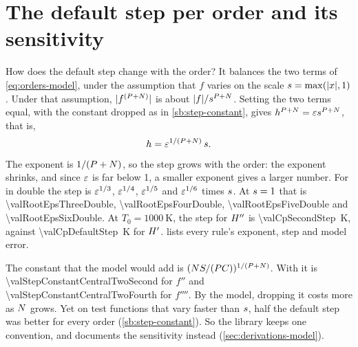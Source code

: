 \begin{figure}
\centering

\end{figure}

\section{The default step per order and its sensitivity}\label{sec:orders-step}

How does the default step change with the order? It balances the two terms of \cref{eq:orders-model}, under the
assumption that $f$ varies on the scale $s = \max(\lvert x \rvert, 1)$. Under that assumption,
$\lvert f^{(P + N)} \rvert$ is about $\lvert f \rvert / s^{P + N}$. Setting the two terms equal, with the
constant dropped as in \cref{sb:step-constant}, gives $h^{P + N} = \varepsilon s^{P + N}$,
that is,
\begin{equation}
  h = \varepsilon^{1/(P + N)}\, s .
  \label{eq:orders-step}
\end{equation}
The exponent is $1/(P + N)$, so the step grows with the order: the exponent shrinks, and since
$\varepsilon$ is far below 1, a smaller exponent gives a larger number. For  in double the step is
$\varepsilon^{1/3}$, $\varepsilon^{1/4}$, $\varepsilon^{1/5}$ and $\varepsilon^{1/6}$ times $s$. At $s = 1$ that is
\num{\valRootEpsThreeDouble}, \num{\valRootEpsFourDouble}, \num{\valRootEpsFiveDouble} and
\num{\valRootEpsSixDouble}. At $T_0 = \SI{1000}{\kelvin}$, the step for $H''$ is \SI{\valCpSecondStep}{\kelvin},
against \SI{\valCpDefaultStep}{\kelvin} for $H'$.  lists every rule's exponent, step and
model error.

The constant that the model would add is $(N S / (P C))^{1/(P + N)}$. With
 it is \num{\valStepConstantCentralTwoSecond} for $f''$ and \num{\valStepConstantCentralTwoFourth}
for $f''''$. By the model, dropping it costs more as $N$ grows. Yet on test functions that vary faster than
$s$, half the default step was better for every order (\cref{sb:step-constant}). So the library keeps one
convention, and documents the sensitivity instead (\cref{sec:derivations-model}).

